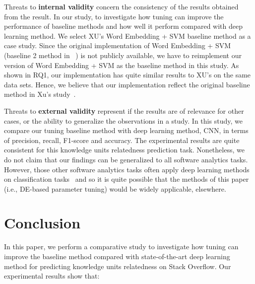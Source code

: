\documentclass[sigconf]{acmart}
\theoremstyle{break}
\begin{document}
Threats to \textbf{internal validity} concern the consistency of the results 
obtained from the result. In our study,  to investigate how
tuning can improve the performance of baseline methods and how well
it perform compared with deep learning method. We select
XU's  Word Embedding + SVM baseline method as a case study. Since the original implementation of 
Word Embedding + SVM (baseline 2 method in ~\cite{xu2016predicting}) is not 
publicly available, we have to reimplement our version of Word Embedding + SVM as
the baseline method in this study. As shown in RQ1, our implementation has
quite similar results to XU's on the same data sets. Hence, we believe that our implementation reflect the original
 baseline method in Xu's study~\cite{xu2016predicting}. 
 
 

 
 
 Threats to \textbf{external validity} represent if the results are of relevance for
 other cases, or the ability to generalize the observations in a study. In this study,
 we compare our tuning baseline method with deep learning method, CNN, in terms of
 precision, recall, F1-score and accuracy. The experimental results are quite consistent
 for this knowledge units relatedness prediction task. 
 Nonetheless, we do not claim that our findings can be generalized to all software analytics tasks. 
 However, those other software analytics tasks often apply deep learning
 methods on classification tasks~\cite{choetkiertikul2016deep, wang2016automatically} 
 and so it is quite possible that
 the methods  of this paper (i.e., DE-based parameter tuning) would
 be widely applicable, elsewhere.
 
 


\section{Conclusion}\label{conclusion}

In this paper, we perform a comparative study to investigate
how tuning can improve the baseline method compared with
 state-of-the-art deep learning method  for predicting
knowledge units relatedness on Stack Overflow. Our experimental
results show that:
\end{document}
